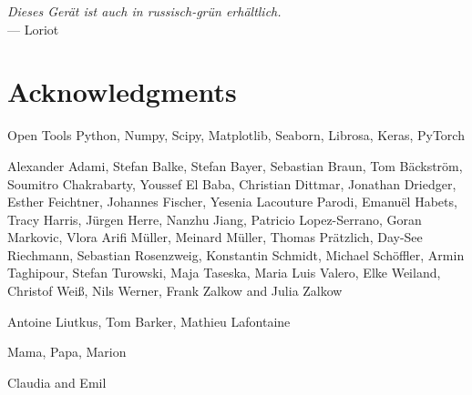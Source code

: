 
\begin{flushright}{\slshape
    Dieses Gerät ist auch in russisch-grün erhältlich.
    }\\ \medskip
    --- Loriot
\end{flushright}



\bigskip

\begingroup
\let\clearpage\relax
\let\cleardoublepage\relax
\let\cleardoublepage\relax
\chapter*{Acknowledgments}
Open Tools
Python, Numpy, Scipy, Matplotlib, Seaborn, Librosa, Keras, PyTorch

Alexander Adami, Stefan Balke, Stefan Bayer, Sebastian Braun, Tom Bäckström, Soumitro Chakrabarty, 
Youssef El Baba, Christian Dittmar, Jonathan Driedger, Esther Feichtner, Johannes Fischer, 
Yesenia Lacouture Parodi, Emanuël Habets, Tracy Harris, Jürgen Herre, Nanzhu Jiang, 
Patricio Lopez-Serrano, Goran Markovic, Vlora Arifi Müller, Meinard Müller, Thomas Prätzlich, 
Day-See Riechmann, Sebastian Rosenzweig, Konstantin Schmidt, Michael Schöffler, Armin Taghipour, 
Stefan Turowski, Maja Taseska, Maria Luis Valero, Elke Weiland, Christof Weiß, Nils Werner, 
Frank Zalkow and Julia Zalkow

\bigskip

Antoine Liutkus, Tom Barker, Mathieu Lafontaine

\bigskip

Mama, Papa, Marion

\bigskip

Claudia and Emil

\endgroup
